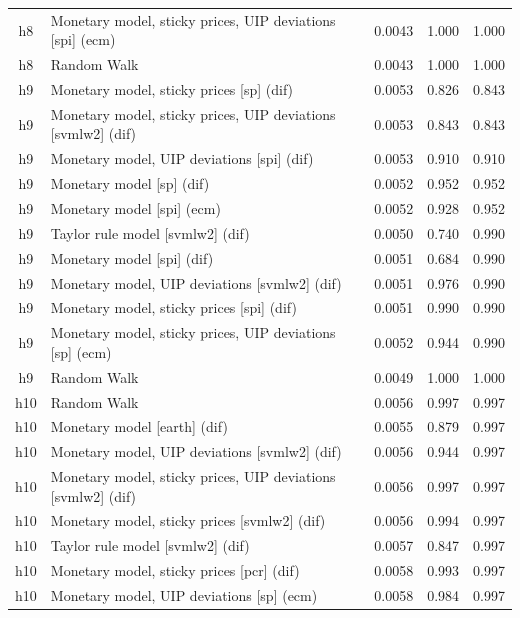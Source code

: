 \begin{ThreePartTable}
\begin{longtable}[t]{cp{5.5cm}ccc}
h8 & \raggedright Monetary model, sticky prices, UIP deviations [spi] (ecm) & 0.0043 & 1.000 & 1.000\\
h8 & \raggedright Random Walk & 0.0043 & 1.000 & 1.000\\
\addlinespace
h9 & \raggedright Monetary model, sticky prices [sp] (dif) & 0.0053 & 0.826 & 0.843\\
h9 & \raggedright Monetary model, sticky prices, UIP deviations [svmlw2] (dif) & 0.0053 & 0.843 & 0.843\\
h9 & \raggedright Monetary model, UIP deviations [spi] (dif) & 0.0053 & 0.910 & 0.910\\
h9 & \raggedright Monetary model [sp] (dif) & 0.0052 & 0.952 & 0.952\\
h9 & \raggedright Monetary model [spi] (ecm) & 0.0052 & 0.928 & 0.952\\
h9 & \raggedright Taylor rule model [svmlw2] (dif) & 0.0050 & 0.740 & 0.990\\
h9 & \raggedright Monetary model [spi] (dif) & 0.0051 & 0.684 & 0.990\\
h9 & \raggedright Monetary model, UIP deviations [svmlw2] (dif) & 0.0051 & 0.976 & 0.990\\
h9 & \raggedright Monetary model, sticky prices [spi] (dif) & 0.0051 & 0.990 & 0.990\\
h9 & \raggedright Monetary model, sticky prices, UIP deviations [sp] (ecm) & 0.0052 & 0.944 & 0.990\\
h9 & \raggedright Random Walk & 0.0049 & 1.000 & 1.000\\
\addlinespace
h10 & \raggedright Random Walk & 0.0056 & 0.997 & 0.997\\
h10 & \raggedright Monetary model [earth] (dif) & 0.0055 & 0.879 & 0.997\\
h10 & \raggedright Monetary model, UIP deviations [svmlw2] (dif) & 0.0056 & 0.944 & 0.997\\
h10 & \raggedright Monetary model, sticky prices, UIP deviations [svmlw2] (dif) & 0.0056 & 0.997 & 0.997\\
h10 & \raggedright Monetary model, sticky prices [svmlw2] (dif) & 0.0056 & 0.994 & 0.997\\
h10 & \raggedright Taylor rule model [svmlw2] (dif) & 0.0057 & 0.847 & 0.997\\
h10 & \raggedright Monetary model, sticky prices [pcr] (dif) & 0.0058 & 0.993 & 0.997\\
h10 & \raggedright Monetary model, UIP deviations [sp] (ecm) & 0.0058 & 0.984 & 0.997\\

\end{longtable}
\end{ThreePartTable}
